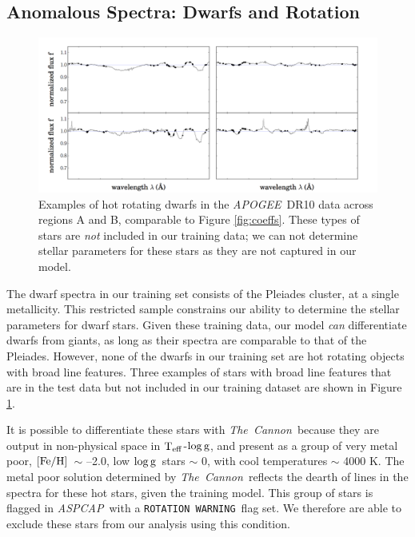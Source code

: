 \documentclass[12pt, preprint]{aastex}
\newcommand{\teff}{\mbox{$\rm T_{eff}$}}
\newcommand{\feh}{\mbox{$\rm [Fe/H]$}}
\newcommand{\logg}{\mbox{$\rm \log g$}}
\newcommand{\tc}{\textsl{The~Cannon}}
\newcommand{\apogee}{\textsl{APOGEE}}
\newcommand{\aspcap}{\textsl{ASPCAP}}
\newcommand{\rotwarn}{\texttt{ROTATION WARNING}}
\begin{document}
\subsection{Anomalous Spectra: Dwarfs and Rotation}

  \begin{figure}[!h]
   \centering
 \includegraphics[width=\hsize]{./plots/2dwarfs.png}
  \caption{Examples of hot rotating dwarfs in the \apogee\ DR10 data across regions A and B, comparable to Figure \ref{fig:coeffs}. These types of stars are \textit{not} included in our training data; we can not determine stellar parameters for these stars as they are not captured in our model.}
\label{fig:dwarfs}
\end{figure}


The dwarf spectra in our training set consists of the Pleiades cluster, at a single metallicity. This restricted sample constrains our ability to determine the stellar parameters for dwarf stars. Given these training data, our model \textit{can} differentiate dwarfs from giants, as long as their spectra are comparable to that of the Pleiades. However, none of the dwarfs in our training set are hot rotating objects with broad line features. Three examples of stars with broad line features that are in the test data but not included in our training dataset are shown in Figure \ref{fig:dwarfs}.

It is possible to differentiate these stars with \tc\ because they are output in non-physical space in \teff-\logg, and present as a group of very metal poor, \feh\ $\sim$ --2.0, low \logg\ stars $\sim$ 0, with cool temperatures $\sim$ 4000 K. The metal poor solution determined by \tc\ reflects the dearth of lines in the spectra for these hot stars, given the training model. This group of stars is flagged in \aspcap\ with a \rotwarn\ flag set. We therefore are able to exclude these stars from our analysis using this condition. 
 
\end{document}
